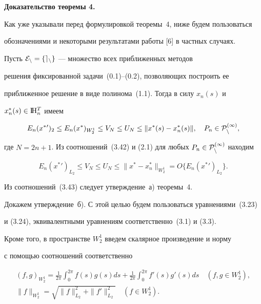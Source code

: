 {\bf Доказательство теоремы 4. }


Как уже указывали перед формулировкой теоремы~4, ниже будем пользоваться


обозначениями и некоторыми результатами работы [6] в частных случаях.


Пусть $\cal E_n=\{ e_n\}$ --- множество всех приближенных методов


решения фиксированной задачи~(0.1)--(0.2), позволяющих построить ее


приближенное решение в виде полинома~(1.1). Тогда в силу $x_n(s)$ и


$x_n^*(s)\in \mathrm I \!\mathrm H_n^T$ имеем


\begin{equation}


E_n(x^*{}')_2\leq E_n(x^*)_{{W_2^1}} \leq V_N\leq U_N\leq 


\|x^*(s)-x_n^*(s)\|, \quad P_n\in \rukopis{P}_n^{(1)},


\end{equation}


где $N=2n+1$. Из соотношений~(3.42) и (2.1) для любых $P_n\in


\rukopis{P}_n^{(1)}$ находим


\begin{equation}


E_n(x^*{}')_{{L_2}}\leq V_N\leq U_N\leq \|x^*-x_n^*\|_{{W_2^1}} =


O \big\{ E_n(x^*{}')_{{L_2}}\big\} .


\end{equation}


Из соотношений~(3.43) следует утверждение~а) теоремы~4.





Докажем утверждение~б). С этой целью будем пользоваться уравнениями~(3.23)


и (3.24), эквивалентными уравнениям соответственно~(3.1) и (3.3).


Кроме того, в пространстве $W_2^1$ введем скалярное произведение и норму


с помощью соотношений соответственно


\begin{gather}


(f,g)_{{W_2^1}}= \frac{1}{2\pi}\int_0^{2\pi}f(s)g(s)


ds+ \frac{1}{2\pi}\int_0^{2\pi}f'(s)g'(s)  ds


\quad (f,g\in W_2^1),\\


%


\|f\|_{{W_2^1}} =\sqrt{\|f\|_{{L_2}} ^2+\|f'\|_{{L_2}} ^2}


\quad (f\in W_2^1).


\end{gather}





